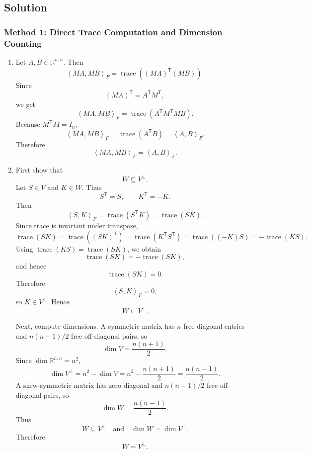 \documentclass[12pt]{article}
\newcommand{\R}{\mathbb{R}}
\newcommand{\tr}{\operatorname{trace}}
\newcommand{\ipF}[2]{\left\langle #1,#2\right\rangle_F}
\newcommand{\T}{\mathsf{T}}
\begin{document}
\newpage
\subsection{Solution}

\subsubsection{Method 1: Direct Trace Computation and Dimension Counting}
\begin{enumerate}[label=(\alph*)]
  \item Let $A,B\in\R^{n,n}$. Then
  \[
    \ipF{MA}{MB}
    =\tr((MA)^\T(MB)).
  \]
  Since
  \[
    (MA)^\T=A^\T M^\T,
  \]
  we get
  \[
    \ipF{MA}{MB}
    =\tr(A^\T M^\T M B).
  \]
  Because $M^\T M=I_n$,
  \[
    \ipF{MA}{MB}
    =\tr(A^\T B)
    =\ipF{A}{B}.
  \]
  Therefore
  \[
    \boxed{\ipF{MA}{MB}=\ipF{A}{B}.}
  \]

  \item First show that
  \[
    W\subseteq V^\perp.
  \]
  Let $S\in V$ and $K\in W$. Thus
  \[
    S^\T=S,
    \qquad
    K^\T=-K.
  \]
  Then
  \[
    \ipF{S}{K}=\tr(S^\T K)=\tr(SK).
  \]
  Since trace is invariant under transpose,
  \[
    \tr(SK)=\tr((SK)^\T)=\tr(K^\T S^\T)=\tr((-K)S)=-\tr(KS).
  \]
  Using $\tr(KS)=\tr(SK)$, we obtain
  \[
    \tr(SK)=-\tr(SK),
  \]
  and hence
  \[
    \tr(SK)=0.
  \]
  Therefore
  \[
    \ipF{S}{K}=0,
  \]
  so $K\in V^\perp$. Hence
  \[
    W\subseteq V^\perp.
  \]

  Next, compute dimensions. A symmetric matrix has $n$ free diagonal entries and $n(n-1)/2$ free off-diagonal pairs, so
  \[
    \dim V=\frac{n(n+1)}2.
  \]
  Since $\dim\R^{n,n}=n^2$,
  \[
    \dim V^\perp=n^2-\dim V
    =n^2-\frac{n(n+1)}2
    =\frac{n(n-1)}2.
  \]
  A skew-symmetric matrix has zero diagonal and $n(n-1)/2$ free off-diagonal pairs, so
  \[
    \dim W=\frac{n(n-1)}2.
  \]
  Thus
  \[
    W\subseteq V^\perp
    \quad\text{and}\quad
    \dim W=\dim V^\perp.
  \]
  Therefore
  \[
    \boxed{W=V^\perp.}
  \]
\end{enumerate}

\newpage
\end{document}
